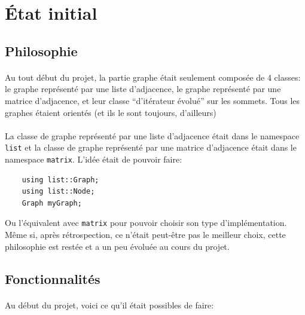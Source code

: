 \documentclass[french]{article}
\begin{document}
\section{État initial}

\subsection{Philosophie}

\paragraph{} Au tout début du projet, la partie graphe était seulement composée
de 4 classes: le graphe représenté par une liste d'adjacence, le graphe
représenté par une matrice d'adjacence, et leur classe ``d'itérateur évolué''
sur les sommets. Tous les graphes étaient orientés (et ils le sont toujours,
d'ailleurs)

\paragraph{} La classe de graphe représenté par une liste d'adjacence était
dans le namespace \texttt{list} et la classe de graphe représenté par une
matrice d'adjacence était dans le namespace \texttt{matrix}. L'idée était de
pouvoir faire:

\begin{verbatim}
	using list::Graph;
	using list::Node;
	Graph myGraph;
\end{verbatim}

Ou l'équivalent avec \texttt{matrix} pour pouvoir choisir son type
d'implémentation. Même si, après rétrospection, ce n'était peut-être pas le
meilleur choix, cette philosophie est restée et a un peu évoluée au cours du
projet.

\subsection{Fonctionnalités}

\paragraph{} Au début du projet, voici ce qu'il était possibles de faire:
\end{document}
